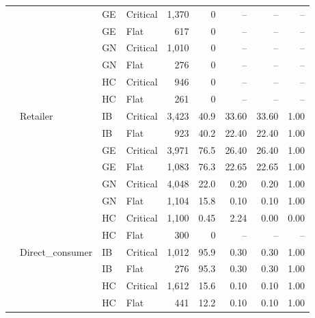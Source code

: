 \begin{longtable}{@{}l l l l r r r r r@{}}
 &  & GE & Critical & 1,370 & 0 & -- & -- & -- \\
 &  & GE & Flat & 617 & 0 & -- & -- & -- \\
 &  & GN & Critical & 1,010 & 0 & -- & -- & -- \\
 &  & GN & Flat & 276 & 0 & -- & -- & -- \\
 &  & HC & Critical & 946 & 0 & -- & -- & -- \\
 &  & HC & Flat & 261 & 0 & -- & -- & -- \\
\addlinespace
 & Retailer & IB & Critical & 3,423 & 40.9 & 33.60 & 33.60 & 1.00 \\
 &  & IB & Flat & 923 & 40.2 & 22.40 & 22.40 & 1.00 \\
 &  & GE & Critical & 3,971 & 76.5 & 26.40 & 26.40 & 1.00 \\
 &  & GE & Flat & 1,083 & 76.3 & 22.65 & 22.65 & 1.00 \\
 &  & GN & Critical & 4,048 & 22.0 & 0.20 & 0.20 & 1.00 \\
 &  & GN & Flat & 1,104 & 15.8 & 0.10 & 0.10 & 1.00 \\
 &  & HC & Critical & 1,100 & 0.45 & 2.24 & 0.00 & 0.00 \\
 &  & HC & Flat & 300 & 0 & -- & -- & -- \\
\addlinespace
 & Direct\_consumer & IB & Critical & 1,012 & 95.9 & 0.30 & 0.30 & 1.00 \\
 &  & IB & Flat & 276 & 95.3 & 0.30 & 0.30 & 1.00 \\
 &  & HC & Critical & 1,612 & 15.6 & 0.10 & 0.10 & 1.00 \\
 &  & HC & Flat & 441 & 12.2 & 0.10 & 0.10 & 1.00 \\
\end{longtable}
\normalsize
